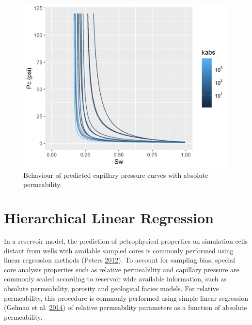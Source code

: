\documentclass[english,msc,numbers]{coppe}
\begin{document}
  \begin{figure}
  
  {\centering \includegraphics[width=0.7\linewidth]{figure/4-5-pcc-posterior-tendency} 
  
  }
  
  \caption{Behaviour of predicted capillary pressure curves with absolute permeability.}\label{fig:pcc-posterior-tendency}
  \end{figure}
  \hypertarget{hierarchical-linear-regression-1}{%
  \section{Hierarchical Linear Regression}\label{hierarchical-linear-regression-1}}
  
  In a reservoir model, the prediction of petrophysical properties on simulation cells distant from wells with available sampled cores is commonly performed using linear regression methods (Peters \protect\hyperlink{ref-Peters2012}{2012}). To account for sampling bias, special core analysis properties such as relative permeability and capillary pressure are commonly scaled according to reservoir wide available information, such as absolute permeability, porosity and geological facies models. For relative permeability, this procedure is commonly performed using simple linear regression (Gelman et al. \protect\hyperlink{ref-Gelman2014}{2014}) of relative permeability parameters as a function of absolute permeability.
  
\end{document}
